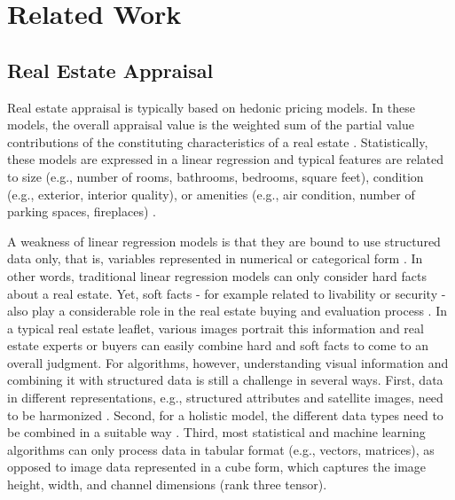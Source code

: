 \documentclass[letterpaper]{article} %
\begin{document}
\section{Related Work}
\subsection{Real Estate Appraisal}
Real estate appraisal is typically based on hedonic pricing models. In these models, the overall appraisal value is the weighted sum of the partial value contributions of the constituting characteristics of a real estate \cite{lancaster1966new, rosen1974hedonic}. Statistically, these models are expressed in a linear regression and typical features are related to size (e.g., number of rooms, bathrooms, bedrooms, square feet), condition (e.g., exterior, interior quality), or amenities (e.g., air condition, number of parking spaces, fireplaces) \cite{ligus2016measuring, limsombunchai2004house, helbich2013boosting, hill2018can, park2015using}.

A weakness of linear regression models is that they are bound to use structured data only, that is, variables represented in numerical or categorical form \cite{law2019take}. In other words, traditional linear regression models can only consider hard facts about a real estate. Yet, soft facts - for example related to livability or security - also play a considerable role in the real estate buying and evaluation process \cite{law2019take}. In a typical real estate leaflet, various images portrait this information and real estate experts or buyers can easily combine hard and soft facts to come to an overall judgment. For algorithms, however, understanding visual information and combining it with structured data is still a challenge in several ways. First, data in different representations, e.g., structured attributes and satellite images, need to be harmonized \cite{liu2018learning}. Second, for a holistic model, the different data types need to be combined in a suitable way \cite{liu2018learning}. Third, most statistical and machine learning algorithms can only process data in tabular format (e.g., vectors, matrices), as opposed to image data represented in a cube form, which captures the image height, width, and channel dimensions (rank three tensor).
\end{document}

